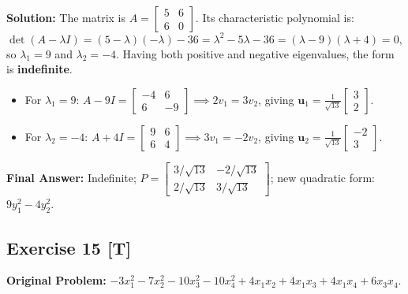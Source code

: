 \documentclass[11pt, letterpaper]{article}
\theoremstyle{definition}
\theoremstyle{remark}
\begin{document}
\textbf{Solution:}
The matrix is $A = \begin{bmatrix} 5 & 6 \\ 6 & 0 \end{bmatrix}$. Its characteristic polynomial is:
\[
\det(A - \lambda I) = (5-\lambda)(-\lambda) - 36 = \lambda^2 - 5\lambda - 36 = (\lambda - 9)(\lambda + 4) = 0,
\]
so $\lambda_1 = 9$ and $\lambda_2 = -4$. Having both positive and negative eigenvalues, the form is \textbf{indefinite}.
\begin{itemize}
    \item For $\lambda_1 = 9$: $A - 9I = \begin{bmatrix} -4 & 6 \\ 6 & -9 \end{bmatrix} \implies 2v_1 = 3v_2$, giving $\mathbf{u}_1 = \frac{1}{\sqrt{13}}\begin{bmatrix} 3 \\ 2 \end{bmatrix}$.
    \item For $\lambda_2 = -4$: $A + 4I = \begin{bmatrix} 9 & 6 \\ 6 & 4 \end{bmatrix} \implies 3v_1 = -2v_2$, giving $\mathbf{u}_2 = \frac{1}{\sqrt{13}}\begin{bmatrix} -2 \\ 3 \end{bmatrix}$.
\end{itemize}
\textbf{Final Answer:} Indefinite; $P = \begin{bmatrix} 3/\sqrt{13} & -2/\sqrt{13} \\ 2/\sqrt{13} & 3/\sqrt{13} \end{bmatrix}$; new quadratic form: $9y_1^2 - 4y_2^2$.

\hrulefill

\subsection*{Exercise 15 [T]}
\textbf{Original Problem:} $-3x_1^2 - 7x_2^2 - 10x_3^2 - 10x_4^2 + 4x_1x_2 + 4x_1x_3 + 4x_1x_4 + 6x_3x_4$.
\end{document}
